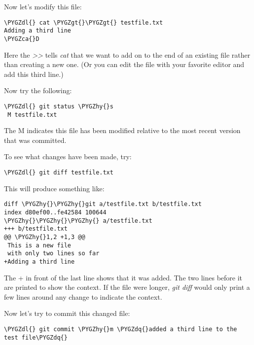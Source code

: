 \documentclass[letterpaper,10pt,english]{sphinxmanual}
\def\PYGZca{\char`\^}
\def\PYGZgt{\char`\>}
\def\PYGZdl{\char`\$}
\def\PYGZhy{\char`\-}
\def\PYGZdq{\char`\"}
\begin{document}
\begin{enumerate}
Now let's modify this file:

\begin{Verbatim}[commandchars=\\\{\}]
\PYGZdl{} cat \PYGZgt{}\PYGZgt{} testfile.txt
Adding a third line
\PYGZca{}D
\end{Verbatim}

Here the \emph{\textgreater{}\textgreater{}} tells \emph{cat} that we want to add on to the end of an
existing file rather than creating a new one.  (Or you can edit the file
with your favorite editor and add this third line.)

Now try the following:

\begin{Verbatim}[commandchars=\\\{\}]
\PYGZdl{} git status \PYGZhy{}s
 M testfile.txt
\end{Verbatim}

The M indicates this file has been modified relative to the most recent
version that was committed.

To see what changes have been made, try:

\begin{Verbatim}[commandchars=\\\{\}]
\PYGZdl{} git diff testfile.txt
\end{Verbatim}

This will produce something like:

\begin{Verbatim}[commandchars=\\\{\}]
diff \PYGZhy{}\PYGZhy{}git a/testfile.txt b/testfile.txt
index d80ef00..fe42584 100644
\PYGZhy{}\PYGZhy{}\PYGZhy{} a/testfile.txt
+++ b/testfile.txt
@@ \PYGZhy{}1,2 +1,3 @@
 This is a new file
 with only two lines so far
+Adding a third line
\end{Verbatim}

The + in front of the last line shows that it was added.
The two lines before it are printed to show the context.  If the
file were longer, \emph{git diff}
would only print a few lines around any change to indicate the context.

Now let's try to commit this changed file:

\begin{Verbatim}[commandchars=\\\{\}]
\PYGZdl{} git commit \PYGZhy{}m \PYGZdq{}added a third line to the test file\PYGZdq{}
\end{Verbatim}


\end{enumerate}
\end{document}
